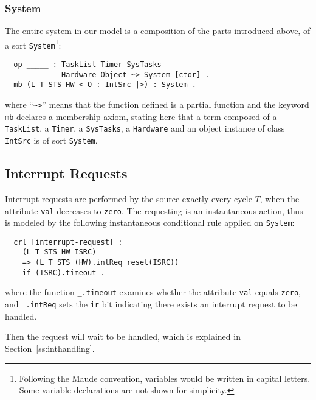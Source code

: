 \documentclass[10pt,journal]{IEEEtran}
\newcommand{\hide}[1]{\ignorespaces}
\begin{document}
{\subsubsection{System}
The entire system in our model is a composition of the parts
introduced above, of a sort \verb|System|\footnote{Following the Maude
  convention, variables would be written in capital letters. Some
  variable declarations are not shown for simplicity.}:
\begin{verbatim}
  op _____ : TaskList Timer SysTasks 
             Hardware Object ~> System [ctor] .
  mb (L T STS HW < O : IntSrc |>) : System .
\end{verbatim}
where ``\verb|~>|'' means that the function defined is a partial
function and the keyword \verb|mb| declares a membership axiom,
stating here that a term composed of a \verb|TaskList|, a
\verb|Timer|, a \verb|SysTasks|, a \verb|Hardware| and an object
instance of class \verb|IntSrc| is of sort \verb|System|.

\subsection{Interrupt Requests}
\label{ss:ir}
Interrupt requests are performed by the source exactly every cycle
$T$, when the attribute \verb|val| decreases to \verb|zero|. The
requesting is an instantaneous action, thus is modeled by the
following instantaneous conditional rule applied on \verb|System|:
\begin{verbatim}
  crl [interrupt-request] :
    (L T STS HW ISRC) 
    => (L T STS (HW).intReq reset(ISRC))
    if (ISRC).timeout .
\end{verbatim}
where the function \verb|_.timeout| examines whether the attribute
\verb|val| equals \verb|zero|, and \verb|_.intReq| sets the \verb|ir|
bit indicating there exists an interrupt request to be handled.
\hide{
\begin{verbatim}
  op _.intReq : Hardware -> Hardware .
  eq [ REGS ; S ].intReq 
       = [ (REGS).setIr ; S ] .
\end{verbatim}
}

Then the request will wait to be handled, which is explained in
Section~\ref{ss:inthandling}.

}
\end{document}
